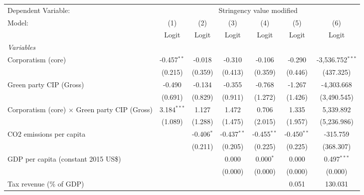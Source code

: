 
\begingroup
\centering
\begin{tabular}{lcccccc}
   \toprule
   Dependent Variable: & \multicolumn{6}{c}{Stringency value modified}\\
   Model:                                               & (1)           & (2)          & (3)           & (4)           & (5)           & (6)\\  
                                                        &  Logit        & Logit        & Logit         & Logit         & Logit         & Logit\\  
   \midrule
   \emph{Variables}\\
   Corporatism (core)                                   & -0.457$^{**}$ & -0.018       & -0.310        & -0.106        & -0.290        & -3,536.752$^{***}$\\   
                                                        & (0.215)       & (0.359)      & (0.413)       & (0.359)       & (0.446)       & (437.325)\\   
   Green party CIP (Gross)                              & -0.490        & -0.134       & -0.355        & -0.768        & -1.267        & -4,303.668\\   
                                                        & (0.691)       & (0.829)      & (0.911)       & (1.272)       & (1.426)       & (3,490.545)\\   
   Corporatism (core) $\times$ Green party CIP (Gross)  & 3.184$^{***}$ & 1.127        & 1.472         & 0.706         & 1.335         & 5,339.892\\   
                                                        & (1.089)       & (1.288)      & (1.475)       & (2.015)       & (1.957)       & (5,236.986)\\   
   CO2 emissions per capita                             &               & -0.406$^{*}$ & -0.437$^{**}$ & -0.455$^{**}$ & -0.450$^{**}$ & -315.759\\   
                                                        &               & (0.211)      & (0.205)       & (0.225)       & (0.225)       & (368.307)\\   
   GDP per capita (constant 2015 US\$)                  &               &              & 0.000         & 0.000$^{*}$   & 0.000         & 0.497$^{***}$\\   
                                                        &               &              & (0.000)       & (0.000)       & (0.000)       & (0.000)\\   
   Tax revenue (\% of GDP)                              &               &              &               &               & 0.051         & 130.031\\   

\end{tabular}
